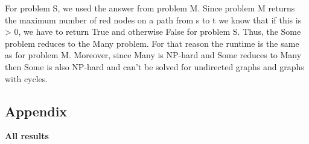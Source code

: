 \documentclass[a4paper]{article}
\begin{document}
For problem S, we used the answer from problem M. Since problem M returns the maximum number of red nodes on a path from s to t we know that if this is > 0, we have
to return True and otherwise False for problem S. Thus, the Some problem reduces to the Many problem.
For that reason the runtime is the same as for problem M. Moreover, since Many is NP-hard and Some reduces to Many then Some is also NP-hard and can't be solved for
undirected graphs and graphs with cycles.

\subsection{Appendix}
\textbf{All results}

\end{document}
